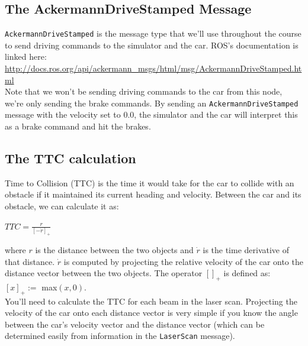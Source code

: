 \documentclass[letter]{article}
\begin{document}
\subsection{The AckermannDriveStamped Message}
\texttt{AckermannDriveStamped} is the message type that we'll use throughout the course to send driving commands to the simulator and the car. ROS's documentation is linked here:\\
\href{http://docs.ros.org/api/ackermann_msgs/html/msg/AckermannDriveStamped.html}{http://docs.ros.org/api/ackermann\_msgs/html/msg/AckermannDriveStamped.html}\\

Note that we won't be sending driving commands to the car from this node, we're only sending the brake commands. By sending an \texttt{AckermannDriveStamped} message with the velocity set to 0.0, the simulator and the car will interpret this as a brake command and hit the brakes.

\subsection{The TTC calculation}
Time to Collision (TTC) is the time it would take for the car to collide with an obstacle if it maintained its current heading and velocity. Between the car and its obstacle, we can calculate it as: \\
\begin{center}
$TTC = \frac{r}{[-\dot{r}]_+}$ \\
\end{center}
where $r$ is the distance between the two objects and $\dot{r}$ is the time derivative of that distance. $\dot{r}$ is computed by projecting the relative velocity of the car onto the distance vector between the two objects. The operator $[]_+$ is defined as: $[x]_+ := $ max$(x, 0)$.\\
You'll need to calculate the TTC for each beam in the laser scan. Projecting the velocity of the car onto each distance vector is very simple if you know the angle between the car's velocity vector and the distance vector (which can be determined easily from information in the \texttt{LaserScan} message).

\end{document}
